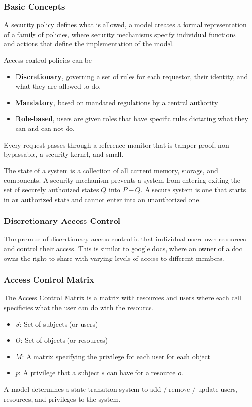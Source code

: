 \documentclass[11pt]{article}
\begin{document}
\subsubsection{Basic Concepts}
A security policy defines what is allowed, a model creates a formal representation of a family of policies, where security mechanisms specify individual functions and actions that define the implementation of the model.

Access control policies can be 
\begin{itemize}
    \item \textbf{Discretionary}, governing a set of rules for each requestor, their identity, and what they are allowed to do.
    \item \textbf{Mandatory}, based on mandated regulations by a central authority.
    \item \textbf{Role-based}, users are given roles that have specific rules dictating what they can and can not do.
\end{itemize}

Every request passes through a reference monitor that is tamper-proof, non-bypassable, a security kernel, and small.

The state of a system is a collection of all current memory, storage, and components.
A security mechanism prevents a system from entering exiting the set of securely authorized states $Q$ into $P -  Q$.
A secure system is one that starts in an authorized state and cannot enter into an unauthorized one.

\subsubsection{Discretionary Access Control}
The premise of discretionary access control is that individual users own resources and control their access.
This is similar to google docs, where an owner of a doc owns the right to share with varying levels of access to different members.

\subsubsection{Access Control Matrix}
The Access Control Matrix is a matrix with resources and users where each cell specificies what the user can do with the resource.

\begin{itemize}
    \item $S$: Set of subjects (or users)
    \item $O$: Set of objects (or resources)
    \item $M$: A matrix specifying the privilege for each user for each object
    \item $p$: A privilege that a subject $s$ can have for a resource $o$.
\end{itemize}
A model determines a state-transition system to add / remove / update users, resources, and privileges to the system.
\end{document}
